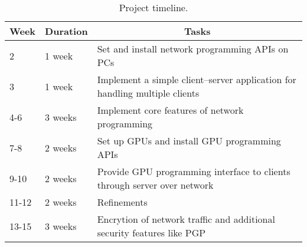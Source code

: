 \documentclass[11pt,a4paper]{article}
\begin{document}
\begin{table}[h]
\begin{center}
\vspace{0.3cm}
	\begin{tabular}{llp{10cm}}
	\hline \hline
		\textbf{Week} \rule{0pt}{2.6ex} & \textbf{Duration} & \multicolumn{1}{c}{\textbf{Tasks}}\\
		\hline
		2 \rule{0pt}{2.6ex} & 1 week & Set and install network programming APIs on PCs\\
		3 & 1 week & Implement a simple client--server application for handling multiple clients\\
		4-6 & 3 weeks & Implement core features of network programming\\
		7-8 & 2 weeks & Set up GPUs and install GPU programming APIs\\
		9-10 & 2 weeks & Provide GPU programming interface to clients through server over network\\
		11-12 & 2 weeks & Refinements\\
		13-15 & 3 weeks & Encrytion of network traffic and additional security features like PGP\\
	\hline \hline
	\end{tabular}
\end{center}
\label{TimelineTable}
\caption{Project timeline.}
\end{table}
\nocite{*}








\end{document}
